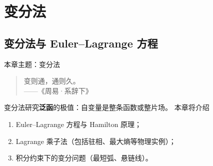 
\section{变分法}
\subsection{变分法与 Euler--Lagrange 方程}


\begin{frame}{本章主题：变分法}
  \begin{quote}
    变则通，通则久。\\
    \hfill ——《周易·系辞下》
  \end{quote}
  变分法研究\textbf{泛函}的极值：自变量是整条函数或整片场。
  本章将介绍
  \begin{enumerate}
    \item Euler–Lagrange 方程与 Hamilton 原理；
    \item Lagrange 乘子法（包括驻相、最大熵等物理实例）；
    \item 积分约束下的变分问题（最短弧、悬链线）。
  \end{enumerate}
\end{frame}